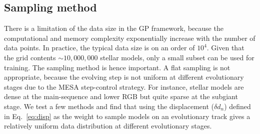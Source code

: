 \subsection{Sampling method}\label{sec:selection}

%
There is a limitation of the data size in the GP framework, because the computational and memory complexity exponentially increase with the number of data points. In practice, the typical data size is on an order of $10^{4}$. Given that the grid contents $\sim 10,000,000$ stellar models, only a small subset can be used for training. The sampling method is hence important.
%
 A flat sampling is not appropriate, because the evolving step is not uniform at different evolutionary stages due to the \textsc{MESA} step-control strategy. For instance, stellar models are dense at the main-sequence and lower RGB but quite sparse at the subgiant stage. We test a few methods and find that using the displacement ($\delta d_{n}$) defined in Eq.~\ref{eq:disp} as the weight to sample models on an evolutionary track gives a relatively uniform data distribution at different evolutionary stages. 



